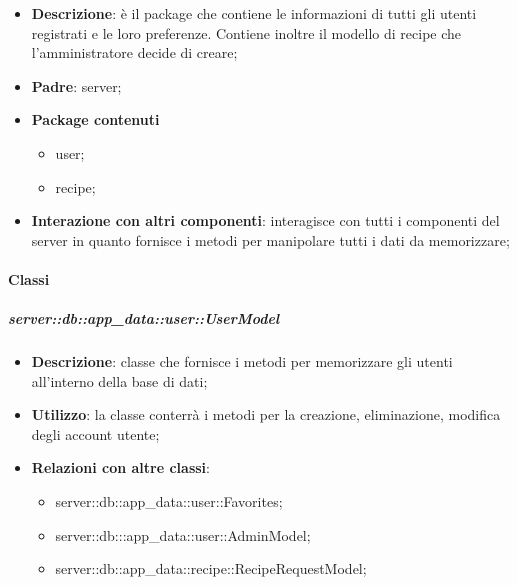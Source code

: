	\begin{itemize}
		\item \textbf{Descrizione}: è il package che contiene le informazioni di tutti gli utenti registrati e le loro preferenze. Contiene inoltre il modello di recipe che l'amministratore decide di creare;
		\item \textbf{Padre}: server;
		\item \textbf{Package contenuti}
			\begin{itemize}
				\item user;
				\item recipe;
			\end{itemize}
		\item \textbf{Interazione con altri componenti}: interagisce con tutti i componenti del server in quanto fornisce i metodi per manipolare tutti i dati da memorizzare;
	\end{itemize}


	\paragraph{Classi} %

		\subparagraph{server::db::app\_data::user::UserModel} %
		\label{subp:server_db_app_data_user_user_model}
			\begin{itemize}
				\item \textbf{Descrizione}: classe che fornisce i metodi per memorizzare gli utenti all'interno della base di dati;
				\item \textbf{Utilizzo}: la classe conterrà i metodi per la creazione, eliminazione, modifica degli account utente;
				\item \textbf{Relazioni con altre classi}:
					\begin{itemize}
						\item server::db::app\_data::user::Favorites;
						\item server::db:::app\_data::user::AdminModel;
						\item server::db::app\_data::recipe::RecipeRequestModel;
					\end{itemize}
			\end{itemize}


